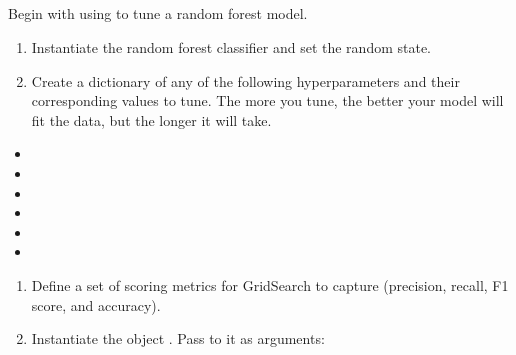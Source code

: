 \documentclass[letterpaper,10pt,english]{sphinxmanual}
\begin{document}
\subsection{}
\label{\detokenize{Automatidata_Machine Learning:random-forest}}
\sphinxAtStartPar
Begin with using  to tune a random forest model.
\begin{enumerate}
%
\item {} 
\sphinxAtStartPar
Instantiate the random forest classifier  and set the random state.

\item {} 
\sphinxAtStartPar
Create a dictionary  of any of the following hyperparameters and their corresponding values to tune. The more you tune, the better your model will fit the data, but the longer it will take.

\end{enumerate}
\begin{itemize}
\item {} 
\sphinxAtStartPar
{}

\item {} 
\sphinxAtStartPar
{}

\item {} 
\sphinxAtStartPar
{}

\item {} 
\sphinxAtStartPar
{}

\item {} 
\sphinxAtStartPar
{}

\item {} 
\sphinxAtStartPar
{}

\end{itemize}
\begin{enumerate}
%
\setcounter{enumi}{2}
\item {} 
\sphinxAtStartPar
Define a set  of scoring metrics for GridSearch to capture (precision, recall, F1 score, and accuracy).

\item {} 
\sphinxAtStartPar
Instantiate the  object . Pass to it as arguments:

\end{enumerate}
\end{document}
